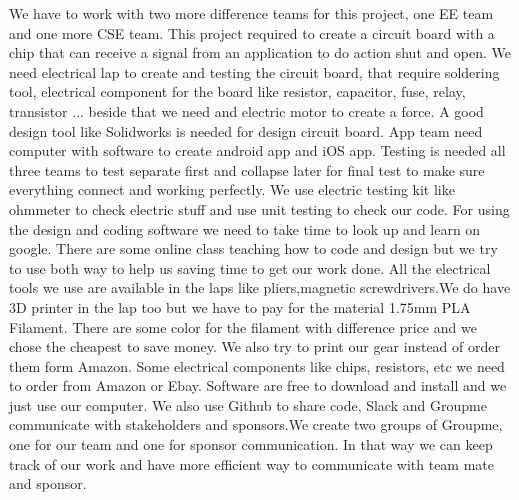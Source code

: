 We have to work with two more difference teams for this project, one EE team and one more CSE team. This project required to create a circuit board with a chip that can receive a signal from an application to do action shut and open. We need electrical lap to create and testing the circuit board, that require soldering tool, electrical component for the board like resistor, capacitor, fuse, relay, transistor ... beside that we need and electric motor to create a force. A good design tool like Solidworks is needed for design circuit board. App team need computer with software to create android app and iOS app.\newline
Testing is needed all three teams to test separate first and collapse later for final test to make sure everything connect and working perfectly. We use electric testing kit like ohmmeter to check electric stuff and use unit testing to check our code.  For using the design and coding software we need to take time to look up and learn on google. There are some online class teaching how to code and design but we try to use both way to help us saving time to get our work done. All the electrical tools we use are available in the laps like pliers,magnetic screwdrivers.We do have 3D printer in the lap too but we have to pay for the material 1.75mm PLA Filament. There are some color for the filament with difference price and we chose the cheapest to save money. We also try to print our gear instead of order them form Amazon. \newline 
Some electrical components like chips, resistors, etc we need to order from Amazon or Ebay.\newline
Software are free to download and install and we just use our computer. We also use Github to share code, Slack and Groupme communicate with stakeholders and sponsors.We create two groups of Groupme, one for our team and one for sponsor communication. In that way we can keep track of our work and have more efficient way to communicate with team mate and sponsor.  





